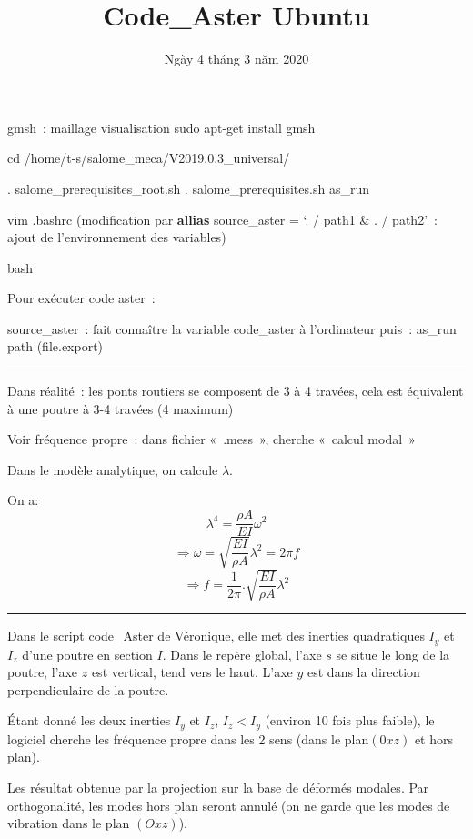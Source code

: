 \documentclass[12pt]{article}
\title{Code\_Aster Ubuntu}
\date{Ngày 4 tháng 3 năm 2020}
\begin{document}
	\maketitle

	gmsh : maillage visualisation
	sudo apt-get install gmsh
	
	cd /home/t-s/salome\_meca/V2019.0.3\_universal/
	
	. salome\_prerequisites\_root.sh 
	. salome\_prerequisites.sh 
	as\_run 
	
	vim .bashrc
	(modification par \textbf{allias} source\_aster = ‘. / path1 \& . / path2’ : ajout de l’environnement des variables)
	
	bash
	
	Pour exécuter code aster :
	
	source\_aster : fait connaître la variable code\_aster à l’ordinateur
	puis :
	as\_run path (file.export) \\
	
	\noindent\rule{18.5cm}{0.4pt}
	\linebreak
	
	Dans réalité : les ponts routiers se composent de 3 à 4 travées, cela est équivalent à une poutre à 3-4 travées (4 maximum)
	
	Voir fréquence propre : dans fichier « .mess », cherche « calcul modal »
	
	Dans le modèle analytique, on calcule $\lambda$.
	
	On a:
	$$\lambda^4 = \frac{\rho A}{EI} \omega^2$$
	$$\Rightarrow \omega = \sqrt{\frac{EI}{\rho A}} \lambda ^2 = 2 \pi f $$
	$$\Rightarrow f = \frac{1}{2 \pi}.\sqrt{\frac{EI}{\rho A}} \lambda ^2 $$
	
	\noindent\rule{18.5cm}{0.4pt}
	\linebreak
	
	Dans le script code\_Aster de Véronique, elle met des inerties quadratiques $I_y$ et $I_z$ d'une poutre en section $I$. Dans le repère global, l'axe $s$ se situe le long de la poutre, l'axe $z$ est vertical, tend vers le haut. L'axe $y$ est dans la direction perpendiculaire de la poutre.
	
	Étant donné les deux inerties $I_y$ et $I_z$, $I_z < I_y$ (environ 10 fois plus faible), le logiciel cherche les fréquence propre dans les 2 sens (dans le plan$(0xz)$ et hors plan).
	
	Les résultat obtenue par la projection sur la base de déformés modales. Par orthogonalité, les modes hors plan seront annulé (on ne garde que les modes de vibration dans le plan $(Oxz)$).
	
	
\end{document}

